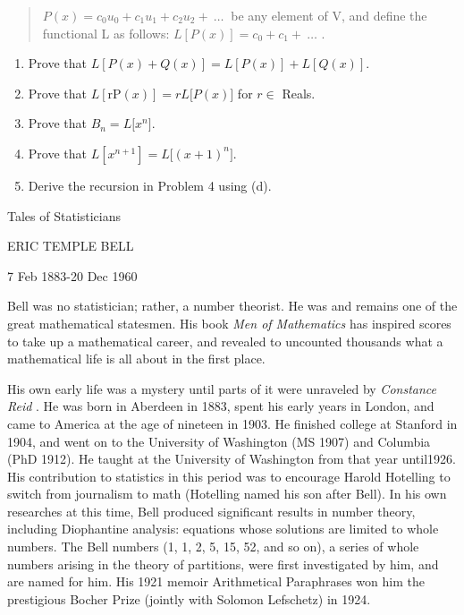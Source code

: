 \begin{quote}
\(P\left( x \right) = c_{0}u_{0} + c_{1}u_{1} + c_{2}u_{2} + \ \ldots\ \)
be any element of V, and define the functional L as follows:
\(L\left\lbrack P\left( x \right) \right\rbrack = c_{0} + c_{1} + \ \ldots\)
.

\end{quote}
\begin{enumerate}
\def\labelenumi{\alph{enumi}.}

\item
  Prove that
  \(L\left\lbrack P\left( x \right) + Q\left( x \right) \right\rbrack = L\left\lbrack P\left( x \right) \right\rbrack + L\left\lbrack Q\left( x \right) \right\rbrack.\)
\item
  Prove that
  \(L\left\lbrack \text{rP}\left( x \right) \right\rbrack = rL\lbrack P\left( x \right)\rbrack\)
  for \(r \in\) Reals.
\item
  Prove that \(B_{n} = L\lbrack x^{n}\rbrack\).
\item
  Prove that
  \(L\left\lbrack x^{n + 1} \right\rbrack = L\lbrack\left( x + 1 \right)^{n}\rbrack\).
\item
  Derive the recursion in Problem 4 using (d).

\end{enumerate}

Tales of Statisticians

ERIC TEMPLE BELL

7 Feb 1883-20 Dec 1960

Bell was no statistician; rather, a number theorist. He was and remains
one of the great mathematical statesmen. His book \emph{Men of
Mathematics} has inspired scores to take up a mathematical career, and
revealed to uncounted thousands what a mathematical life is all about in
the first place.

His own early life was a mystery until parts of it were unraveled by
\emph{Constance Reid} . He was born in Aberdeen in 1883, spent his early
years in London, and came to America at the age of nineteen in 1903. He
finished college at Stanford in 1904, and went on to the University of
Washington (MS 1907) and Columbia (PhD 1912). He taught at the
University of Washington from that year until1926. His contribution to
statistics in this period was to encourage Harold Hotelling to switch
from journalism to math (Hotelling named his son after Bell). In his own
researches at this time, Bell produced significant results in number
theory, including Diophantine analysis: equations whose solutions are
limited to whole numbers. The Bell numbers (1, 1, 2, 5, 15, 52, and so
on), a series of whole numbers arising in the theory of partitions, were
first investigated by him, and are named for him. His 1921 memoir
Arithmetical Paraphrases won him the prestigious Bocher Prize (jointly
with Solomon Lefschetz) in 1924.

